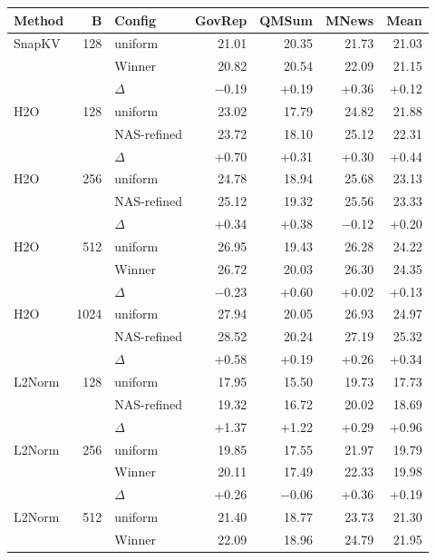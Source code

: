 \begin{table}[tp]
  \centering
  \scriptsize
  \setlength{\tabcolsep}{2.5pt}
  \begin{tabular}{@{}l r l r r r r @{}}
    \toprule
    Method & B & Config & GovRep & QMSum & MNews & Mean \\
    \midrule
    SnapKV & 128 & uniform & 21.01 & 20.35 & 21.73 & 21.03 \\
     &  & Winner & 20.82 & 20.54 & 22.09 & 21.15 \\
     &  & $\Delta$ & $-$0.19 & +0.19 & +0.36 & +0.12 \\
    \midrule
    H2O & 128 & uniform & 23.02 & 17.79 & 24.82 & 21.88 \\
     &  & NAS-refined & 23.72 & 18.10 & 25.12 & 22.31 \\
     &  & $\Delta$ & +0.70 & +0.31 & +0.30 & +0.44 \\
    \midrule
    H2O & 256 & uniform & 24.78 & 18.94 & 25.68 & 23.13 \\
     &  & NAS-refined & 25.12 & 19.32 & 25.56 & 23.33 \\
     &  & $\Delta$ & +0.34 & +0.38 & $-$0.12 & +0.20 \\
    \midrule
    H2O & 512 & uniform & 26.95 & 19.43 & 26.28 & 24.22 \\
     &  & Winner & 26.72 & 20.03 & 26.30 & 24.35 \\
     &  & $\Delta$ & $-$0.23 & +0.60 & +0.02 & +0.13 \\
    \midrule
    H2O & 1024 & uniform & 27.94 & 20.05 & 26.93 & 24.97 \\
     &  & NAS-refined & 28.52 & 20.24 & 27.19 & 25.32 \\
     &  & $\Delta$ & +0.58 & +0.19 & +0.26 & +0.34 \\
    \midrule
    L2Norm & 128 & uniform & 17.95 & 15.50 & 19.73 & 17.73 \\
     &  & NAS-refined & 19.32 & 16.72 & 20.02 & 18.69 \\
     &  & $\Delta$ & +1.37 & +1.22 & +0.29 & +0.96 \\
    \midrule
    L2Norm & 256 & uniform & 19.85 & 17.55 & 21.97 & 19.79 \\
     &  & Winner & 20.11 & 17.49 & 22.33 & 19.98 \\
     &  & $\Delta$ & +0.26 & $-$0.06 & +0.36 & +0.19 \\
    \midrule
    L2Norm & 512 & uniform & 21.40 & 18.77 & 23.73 & 21.30 \\
     &  & Winner & 22.09 & 18.96 & 24.79 & 21.95 \\

\end{tabular}
\end{table}
